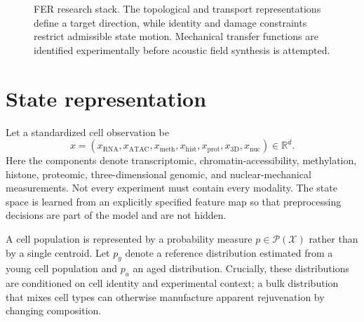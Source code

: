 \documentclass[11pt]{article}
\newcommand{\R}{\mathbb{R}}
\newcommand{\Prob}{\mathcal P}
\begin{document}
\begin{figure}[t]
\centering
{}
\caption{FER research stack. The topological and transport representations define a target direction, while identity and damage constraints restrict admissible state motion. Mechanical transfer functions are identified experimentally before acoustic field synthesis is attempted.}
\label{fig:ferstack}
\end{figure}

\section{State representation}
Let a standardized cell observation be
\begin{equation}
 x = \left(x_{\mathrm{RNA}},x_{\mathrm{ATAC}},x_{\mathrm{meth}},x_{\mathrm{hist}},x_{\mathrm{prot}},x_{\mathrm{3D}},x_{\mathrm{nuc}}\right) \in \R^d.
\label{eq:x}
\end{equation}
Here the components denote transcriptomic, chromatin-accessibility, methylation, histone, proteomic, three-dimensional genomic, and nuclear-mechanical measurements. Not every experiment must contain every modality. The state space is learned from an explicitly specified feature map so that preprocessing decisions are part of the model and are not hidden.

A cell population is represented by a probability measure $p \in \Prob(\mathcal X)$ rather than by a single centroid. Let $p_y$ denote a reference distribution estimated from a young cell population and $p_a$ an aged distribution. Crucially, these distributions are conditioned on cell identity and experimental context; a bulk distribution that mixes cell types can otherwise manufacture apparent rejuvenation by changing composition.
\end{document}
